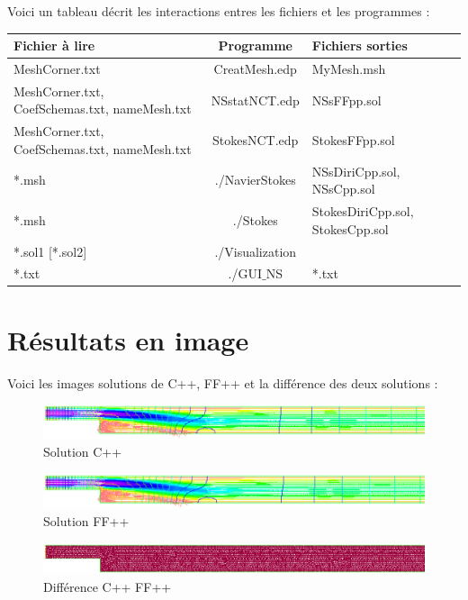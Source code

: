 \documentclass{book}
\begin{document}
Voici un tableau décrit les interactions entres les fichiers et les programmes :
\begin{center}
\begin{tabular}{|p{3cm}|c|p{3cm}|}
 \hline
\textbf{Fichier à lire}&\textbf{Programme} &\textbf{Fichiers sorties} \\  \hline
MeshCorner.txt & CreatMesh.edp & MyMesh.msh\\  \hline
MeshCorner.txt, CoefSchemas.txt, nameMesh.txt & NSstatNCT.edp & NSsFFpp.sol \\  \hline
MeshCorner.txt, CoefSchemas.txt, nameMesh.txt & StokesNCT.edp & StokesFFpp.sol \\  \hline
*.msh           &./NavierStokes   & NSsDiriCpp.sol, NSsCpp.sol \\  \hline
*.msh           & ./Stokes        & StokesDiriCpp.sol, StokesCpp.sol \\  \hline
*.sol1 [*.sol2] & ./Visualization & \\  \hline
*.txt           & ./GUI$\_$NS       & *.txt\\  \hline
\end{tabular}
\end{center}
\section{Résultats en image }
Voici les images solutions de C++, FF++ et la différence des deux solutions :
\begin{center}
\begin{figure}[h]
 \centering
 \includegraphics[scale=0.30]{Sol1}
 \caption{Solution C++}
\end{figure}
\end{center}

\begin{center}
\begin{figure}[h]
 \centering
 \includegraphics[scale=0.30]{Sol2}
 \caption{Solution FF++}
\end{figure}
\end{center}

\begin{center}
\begin{figure}[h]
 \centering
 \includegraphics[scale=0.30]{Erreur}
 \caption{Différence C++ FF++}
\end{figure}
\end{center} 
\end{document}
